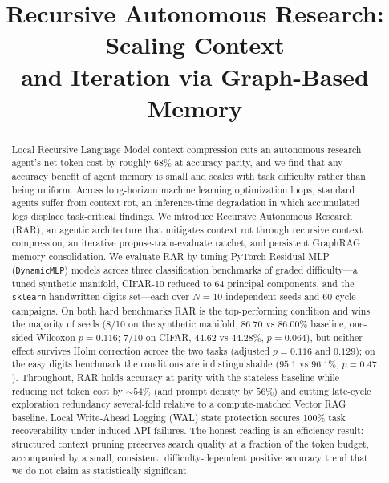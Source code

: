 \documentclass[conference]{IEEEtran}
\begin{document}
\title{Recursive Autonomous Research: Scaling Context\\ and Iteration via Graph-Based Memory}
\author{
}
\maketitle

\begin{abstract}
Local Recursive Language Model context compression cuts an autonomous research agent's net token cost by roughly 68\% at accuracy parity, and we find that any accuracy benefit of agent memory is small and scales with task difficulty rather than being uniform. Across long-horizon machine learning optimization loops, standard agents suffer from context rot, an inference-time degradation in which accumulated logs displace task-critical findings. We introduce Recursive Autonomous Research (RAR), an agentic architecture that mitigates context rot through recursive context compression, an iterative propose-train-evaluate ratchet, and persistent GraphRAG memory consolidation. We evaluate RAR by tuning PyTorch Residual MLP (\texttt{DynamicMLP}) models across three classification benchmarks of graded difficulty---a tuned synthetic manifold, CIFAR-10 reduced to 64 principal components, and the \texttt{sklearn} handwritten-digits set---each over $N=10$ independent seeds and 60-cycle campaigns. On both hard benchmarks RAR is the top-performing condition and wins the majority of seeds (8/10 on the synthetic manifold, $86.70$ vs $86.00\%$ baseline, one-sided Wilcoxon $p = 0.116$; 7/10 on CIFAR, $44.62$ vs $44.28\%$, $p = 0.064$), but neither effect survives Holm correction across the two tasks (adjusted $p = 0.116$ and $0.129$); on the easy digits benchmark the conditions are indistinguishable ($95.1$ vs $96.1\%$, $p = 0.47$). Throughout, RAR holds accuracy at parity with the stateless baseline while reducing net token cost by $\sim 54\%$ (and prompt density by $56\%$) and cutting late-cycle exploration redundancy several-fold relative to a compute-matched Vector RAG baseline. Local Write-Ahead Logging (WAL) state protection secures 100\% task recoverability under induced API failures. The honest reading is an efficiency result: structured context pruning preserves search quality at a fraction of the token budget, accompanied by a small, consistent, difficulty-dependent positive accuracy trend that we do not claim as statistically significant.
\end{abstract}
\end{document}
